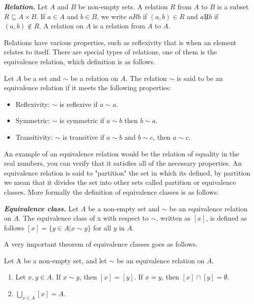 \documentclass{report}
\begin{document}
    \begin{defBox}
        \textit{\textbf{Relation.}} Let $A$ and $B$ be non-empty sets. A relation $R$ from $A$ to $B$ is a subset $R\subseteq A\times B$. If $a \in A$ and $b \in B$, we write $a R b$ if $(a,b) \in R$ and $a \not R b$ if $(a,b) \not \in R$. A relation on $A$ is a relation from $A$ to $A$.
    \end{defBox}

    Relations have various properties, such as reflexivity that is when an element relates to itself. There are special types of relations, one of them is the equivalence relation, which definition is as follows.

    Let $A$ be a set and $\sim$ be a relation on $A$. The relation $\sim$ is said to be an equivalence relation if it meets the following properties:

    \begin{itemize}
        \item Reflexivity: $\sim$ is reflexive if $a \sim a$.
        \item Symmetric: $\sim$ is symmetric if $a \sim b$ then $b \sim a$.
        \item Transitivity: $\sim$ is transitive if $a \sim b$ and $b \sim c$, then $a \sim c$.
    \end{itemize}

    An example of an equivalence relation would be the relation of equality in the real numbers, you can verify that it satisfies all of the necessary properties. An equivalence relation is said to "partition" the set in which its defined, by partition we mean that it divides the set into other sets called partition or equivalence classes. More formally the definition of equivalence classes is as follows:

    \begin{defBox}
        \textit{\textbf{Equivalence class.}} Let $A$ be a non-empty set and $\sim$ be an equivalence relation on $A$. The equivalence class of x with respect to $\sim$, written as $[x]$, is defined as follows $[x] = \{y \in A | x \sim y\}$ for all $y$ in $A$.
    \end{defBox}

    A very important theorem of equivalence classes goes as follows.

    \begin{thBox}
        Let A be a non-empty set, and let $\sim$ be an equivalence relation on $A$.

        \begin{enumerate}
            \item Let $x, y \in A$. If $x\sim y$, then $[x] = [y]$. If $x \not \sim y$, then $[x] \cap [y] = \emptyset$.
            \item $\bigcup_{x\in A}[x] = A$.
        \end{enumerate}
    \end{thBox}
\end{document}
